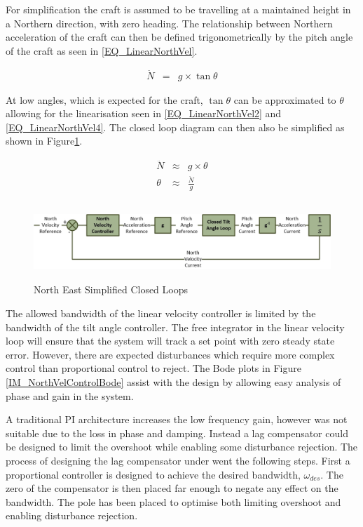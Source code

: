 	For simplification the craft is assumed to be travelling at a maintained height in a Northern direction, with zero heading. The relationship between Northern acceleration of the craft can then be defined trigonometrically by the pitch angle of the craft as seen in \eqref{EQ_LinearNorthVel}. 
	
	\begin{eqnarray}
	\ddot{N} &=& g\times \tan \theta \label{EQ_LinearNorthVel}
	\end{eqnarray}

	At low angles, which is expected for the craft, $\tan \theta$ can be approximated to $\theta$ allowing for the linearisation seen in \eqref{EQ_LinearNorthVel2} and \eqref{EQ_LinearNorthVel4}. The closed loop diagram can then also be simplified as shown in Figure\ref{IM_NorthVelocityLoop}.
	
	\begin{eqnarray}
	\ddot{N} &\approx& g\times \theta \label{EQ_LinearNorthVel2}\\\label{EQ_LinearNorthVel3}
	\theta 	&\approx& \frac{\ddot{N}}{g} \label{EQ_LinearNorthVel4}
	\end{eqnarray}
	
	\begin{figure}[H]
		\centering
		\includegraphics[height = 2.9cm]{../References/Diagrams/NorthVelocityLoop.jpg}
		\caption{North East Simplified Closed Loops}
		\label{IM_NorthVelocityLoop}
	\end{figure}
	
	The allowed bandwidth of the linear velocity controller is limited by the bandwidth of the tilt angle controller. The free integrator in the linear velocity loop will ensure that the system will track a set point with zero steady state error. However, there are expected disturbances which require more complex control than proportional control to reject. The Bode plots in Figure \ref{IM_NorthVelControlBode} assist with the design by allowing easy analysis of phase and gain in the system.
	
	A traditional PI architecture increases the low frequency gain, however was not suitable due to the loss in phase and damping. Instead a lag compensator could be designed to limit the overshoot while enabling some disturbance rejection. The process of designing the lag compensator under went the following steps. First a proportional controller is designed to achieve the desired bandwidth, $\omega_{des}$. The zero of the compensator is then placed far enough to negate any effect on the bandwidth. The pole has been placed to optimise both limiting overshoot and enabling disturbance rejection.
	
